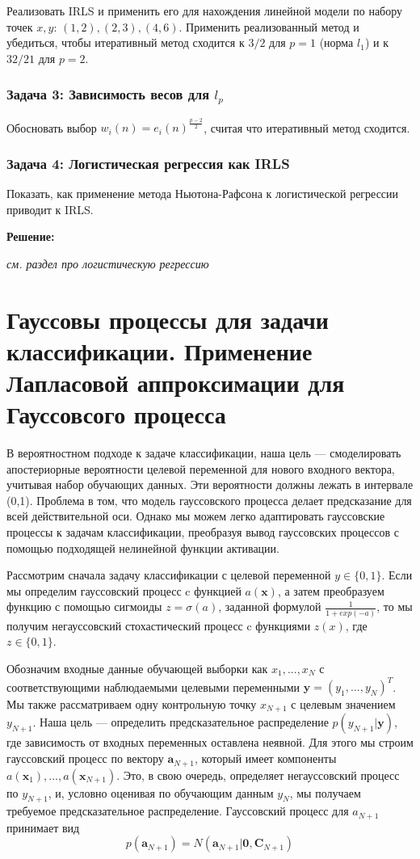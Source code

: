 {Реализовать IRLS и применить его для нахождения линейной модели по набору точек $x, y$: $(1, 2), (2, 3), (4, 6)$. Применить реализованный метод и убедиться, чтобы итеративный метод сходится к $3 / 2$ для $p = 1$ (норма $l_1$) и к $32 / 21$ для $p = 2$.

\subsubsection{Задача 3: Зависимость весов для $l_p$}

Обосновать выбор $w_i(n) = e_i(n)^{\frac{p - 2}{2}}$, считая что итеративный метод сходится.

\subsubsection{Задача 4: Логистическая регрессия как IRLS}

Показать, как применение метода Ньютона-Рафсона к логистической регрессии приводит к IRLS.

\textbf{Решение:}

\textit{см. раздел про логистическую регрессию}

\section{Гауссовы процессы для задачи классификации. Применение Лапласовой аппроксимации для Гауссовсого процесса}

В вероятностном подходе к задаче классификации, наша цель — смоделировать апостериорные
вероятности целевой переменной для нового входного вектора, учитывая набор обучающих
данных. Эти вероятности должны лежать в интервале (0,1). Проблема в том, что модель гауссовского процесса делает предсказание для всей действительной оси. Однако мы можем легко
адаптировать гауссовские процессы к задачам классификации, преобразуя вывод
гауссовских процессов с помощью подходящей нелинейной функции активации.

Рассмотрим сначала задачу классификации с целевой переменной $y \in \{0,1\}$. Если мы определим гауссовский процесс c функцией $a(\mathbf{x})$, а затем преобразуем функцию с помощью сигмоиды $z=\sigma(a)$, заданной формулой $\frac{1}{1+exp(-a)}$, то мы получим негауссовский
стохастический процесс c функциями $z(x)$, где $z \in \{0,1\}$.

Обозначим входные данные обучающей выборки как $x_1,...,x_N$ с соответствующими
наблюдаемыми целевыми переменными $\mathbf{y} =(y_1,...,y_N)^T$. Мы также рассматриваем одну контрольную точку
$x_{N+1}$ с целевым значением $y_{N+1}$. Наша цель — определить предсказательное распределение
$p(y_{N+1}|\mathbf{y})$, где зависимость от входных переменных оставлена неявной. Для этого мы строим гауссовский процесс по вектору $\mathbf{a}_{N+1}$, который имеет компоненты $a(\mathbf{x}_1),...,a(\mathbf{x}_{N+1})$. Это, в свою очередь, определяет негауссовский процесс по $y_{N+1}$,
и, условно оценивая по обучающим данным $y_N$, мы получаем требуемое предсказательное распределение. Гауссовский процесс для $a_{N+1}$ принимает вид
\[ p(\mathbf{a}_{N+1})=N(\mathbf{a}_{N+1}|\mathbf{0},\mathbf{C}_{N+1})\]

}
